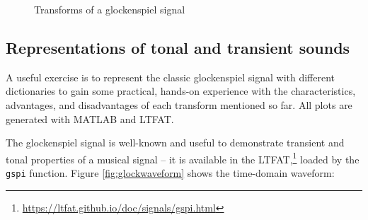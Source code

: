 \documentclass[letter,12pt]{article}
\begin{document}
\begin{figure}[ht]
	\centering
	\hspace{0.35em}
	\hspace{0.35em}
	\caption{Transforms of a glockenspiel signal \cite{balazs}}
	\label{fig:nsgtglock}
\end{figure}

\subsection{Representations of tonal and transient sounds}

A useful exercise is to represent the classic glockenspiel signal with different dictionaries to gain some practical, hands-on experience with the characteristics, advantages, and disadvantages of each transform mentioned so far. All plots are generated with MATLAB and LTFAT.

The glockenspiel signal is well-known and useful to demonstrate transient and tonal properties of a musical signal -- it is available in the LTFAT,\footnote{\url{https://ltfat.github.io/doc/signals/gspi.html}} loaded by the \Verb#gspi# function. Figure \ref{fig:glockwaveform} shows the time-domain waveform:
\end{document}
